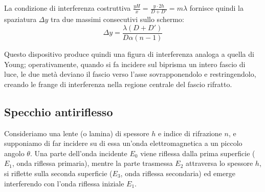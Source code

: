 \documentclass[openany,a4paper,12pt]{book}
\begin{document}
La condizione di interferenza costruttiva $\frac{y H}{x} = \frac{y \cdot 2h}{D + D'} = m\lambda$ fornisce quindi la spaziatura $\Delta y$ tra due massimi consecutivi sullo schermo:
\[
    \Delta y = \frac{\lambda (D + D')}{D \alpha (n - 1)}
\]

Questo dispositivo produce quindi una figura di interferenza analoga a quella di Young; operativamente, quando si fa incidere sul biprisma un intero fascio di luce, le due metà deviano il fascio verso l'asse sovrapponendolo e restringendolo, creando le frange di interferenza nella regione centrale del fascio rifratto.

\subsection{Specchio antiriflesso}

Consideriamo una lente (o lamina) di spessore $h$ e indice di rifrazione $n$, e supponiamo di far incidere su di essa un'onda elettromagnetica a un piccolo angolo $\theta$. Una parte dell'onda incidente $E_0$ viene riflessa dalla prima superficie ($E_1$, onda riflessa primaria), mentre la parte trasmessa $E_2$ attraversa lo spessore $h$, si riflette sulla seconda superficie ($E_3$, onda riflessa secondaria) ed emerge interferendo con l'onda riflessa iniziale $E_1$.
\end{document}
